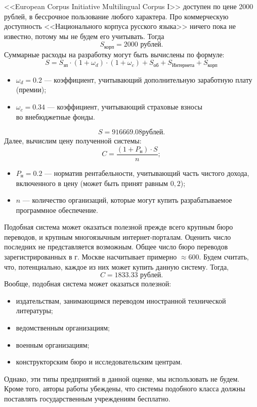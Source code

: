 <<European Corpus Initiative Multilingual Corpus I>> доступен по цене 2000 рублей, в бессрочное пользование любого характера.
Про коммерческую доступность <<Национального корпуса русского языка>> ничего пока не известно, потому мы не будем его учитывать.
Тогда
\[
	S_{\text{корп}} = 2000  \text{ рублей}.
\]
Суммарные расходы на разработку могут быть вычислены по формуле:
\[
	S = 	S_{\text{зп}} \cdot (1 + \omega_{d}) \cdot  (1 + \omega_{c}) + S_{\text{об}} + S_{\text{Интернета}} + S_{\text{корп}}
\]
\begin{itemize}
	\item  $\omega_{d} = 0.2$ --- коэффициент, учитывающий дополнительную заработную плату (премии);
	\item  $\omega_{c} = 0.34$ --- коэффициент, учитывающий страховые взносы \\ во внебюджетные фонды.
\end{itemize}
\[
	S = 916669.08 \text{рублей}.
\]
Далее, вычислим цену полученной системы:
\[
	C = \dfrac{(1 + P_{\text{н}}) \cdot S}{n};
\]
\begin{itemize}
	\item  $P_{\text{н}} = 0.2$ --- норматив рентабельности, учитывающий часть чистого дохода, 
		включенного в цену (может быть принят равным $0,2$);
	\item  $n$ --- количество организаций, которые могут купить разрабатываемое программное обеспечение.
\end{itemize}
Подобная система может оказаться полезной прежде всего крупным бюро переводов, 
и крупным многоязычным интернет-порталам. Оценить число последних не представляется возможным.
Общее число бюро переводов зарегистрированных в г. Москве насчитывает примерно  $\approx 600$.
Будем считать, что, потенциально,  каждое из них может купить данную систему.
Тогда,
\[
	C = 1833.33 \text{ рублей}.
\]
Вообще, подобная система может оказаться полезной:
\begin{itemize}
	\item издательствам, занимающимся переводом иностранной технической литературы;
	\item ведомственным организациям;
	\item военным организациям;
	\item конструкторским бюро и исследовательским центрам.
\end{itemize}
Однако, эти типы предприятий в данной оценке, мы использовать не будем.
Кроме того, авторы работы убеждены, что системы подобного 
класса должны поставлять государственным учреждениям бесплатно.
